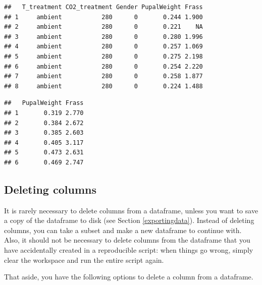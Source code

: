 \documentclass[]{book}
\newenvironment{Shaded}{\begin{snugshade}}{\end{snugshade}}
\newcommand{\CommentTok}[1]{\textcolor[rgb]{0.56,0.35,0.01}{\textit{#1}}}
\newcommand{\FloatTok}[1]{\textcolor[rgb]{0.00,0.00,0.81}{#1}}
\newcommand{\KeywordTok}[1]{\textcolor[rgb]{0.13,0.29,0.53}{\textbf{#1}}}
\newcommand{\NormalTok}[1]{#1}
\newcommand{\OperatorTok}[1]{\textcolor[rgb]{0.81,0.36,0.00}{\textbf{#1}}}
\newcommand{\StringTok}[1]{\textcolor[rgb]{0.31,0.60,0.02}{#1}}
\begin{document}
\begin{verbatim}
##   T_treatment CO2_treatment Gender PupalWeight Frass
## 1     ambient           280      0       0.244 1.900
## 2     ambient           280      0       0.221    NA
## 3     ambient           280      0       0.280 1.996
## 4     ambient           280      0       0.257 1.069
## 5     ambient           280      0       0.275 2.198
## 6     ambient           280      0       0.254 2.220
## 7     ambient           280      0       0.258 1.877
## 8     ambient           280      0       0.224 1.488
\end{verbatim}

\begin{Shaded}
\end{Shaded}

\begin{verbatim}
##   PupalWeight Frass
## 1       0.319 2.770
## 2       0.384 2.672
## 3       0.385 2.603
## 4       0.405 3.117
## 5       0.473 2.631
## 6       0.469 2.747
\end{verbatim}

\hypertarget{deleting-columns}{%
\subsection{Deleting columns}\label{deleting-columns}}

It is rarely necessary to delete columns from a dataframe, unless you want to save a copy of the dataframe to disk (see Section \ref{exportingdata}). Instead of deleting columns, you can take a subset and make a new dataframe to continue with. Also, it should not be necessary to delete columns from the dataframe that you have accidentally created in a reproducible script: when things go wrong, simply clear the workspace and run the entire script again.

That aside, you have the following options to delete a column from a dataframe.
\end{document}
